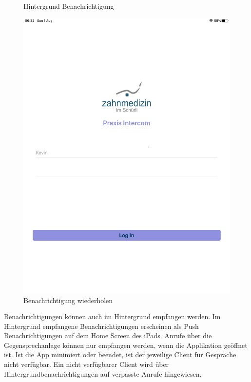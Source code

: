 \begin{figure}[h]
\begin{minipage}[b]{0.4\textwidth}
        \caption{Hintergrund Benachrichtigung}
    \end{minipage}
    \hfill
    \begin{minipage}[b]{0.4\textwidth}
        \includegraphics[width=\textwidth]{graphics/screenshots/placeholder}
        \caption{Benachrichtigung wiederholen}
    \end{minipage}
    \label{fig:MobileClient-Screens4}
\end{figure}

Benachrichtigungen können auch im Hintergrund empfangen werden.
Im Hintergrund empfangene Benachrichtigungen erscheinen als Push Benachrichtigungen auf dem Home Screen des iPads.
Anrufe über die Gegensprechanlage können nur empfangen werden, wenn die Applikation geöffnet ist.
Ist die App minimiert oder beendet, ist der jeweilige Client für Gespräche nicht verfügbar.
Ein nicht verfügbarer Client wird über Hintergrundbenachrichtigungen auf verpasste Anrufe hingewiesen.

